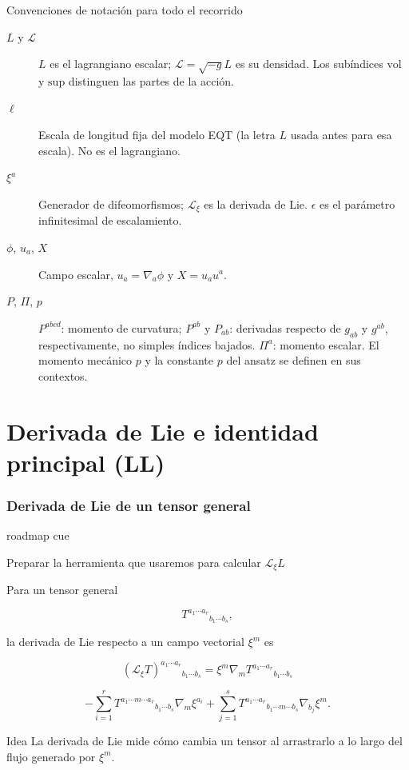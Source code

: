 \documentclass{beamer}
\newcommand{\Lie}{\mathcal{L}}
\newcommand{\RoadmapCue}[1]{%
    \begin{beamercolorbox}[
        wd=\textwidth,
        sep=.55ex,
        leftskip=.8ex,
        rounded=true
    ]{roadmap cue}

    \scriptsize
    \enspace #1

    \end{beamercolorbox}

    \vspace{.25em}
}
\begin{document}


\begin{frame}[label=nav-notation]{Convenciones de notación para todo el recorrido}
\small
\begin{description}
\item[$L$ y $\mathscr L$] $L$ es el lagrangiano escalar; $\mathscr L=\sqrt{-g}L$ es su densidad. Los subíndices $\mathrm{vol}$ y $\mathrm{sup}$ distinguen las partes de la acción.
\item[$\ell$] Escala de longitud fija del modelo EQT (la letra $L$ usada antes para esa escala). No es el lagrangiano.
\item[$\xi^a$] Generador de difeomorfismos; $\Lie_\xi$ es la derivada de Lie. $\epsilon$ es el parámetro infinitesimal de escalamiento.
\item[$\phi$, $u_a$, $X$] Campo escalar, $u_a=\nabla_a\phi$ y $X=u_au^a$.
\item[$P$, $\Pi$, $p$] $P^{abcd}$: momento de curvatura; $P^{ab}$ y $P_{ab}$: derivadas respecto de $g_{ab}$ y $g^{ab}$, respectivamente, no simples índices bajados. $\Pi^a$: momento escalar. El momento mecánico $p$ y la constante $p$ del ansatz se definen en sus contextos.
\end{description}
\end{frame}

\section{Derivada de Lie e identidad principal (LL)}

\begin{frame}[label=nav-frame-004]
\frametitle{Derivada de Lie de un tensor general}

\RoadmapCue{
Preparar la herramienta que usaremos para calcular
$\Lie_\xi L$
}
\small

Para un tensor general

\[
T^{a_1\cdots a_r}{}_{b_1\cdots b_s},
\]

la derivada de Lie respecto a un campo vectorial $\xi^m$ es

\[
(\Lie_\xi T)^{a_1\cdots a_r}{}_{b_1\cdots b_s}
=
\xi^m\nabla_mT^{a_1\cdots a_r}{}_{b_1\cdots b_s}
\]

\[
-\sum_{i=1}^{r}
T^{a_1\cdots m\cdots a_r}{}_{b_1\cdots b_s}
\nabla_m\xi^{a_i}
+
\sum_{j=1}^{s}
T^{a_1\cdots a_r}{}_{b_1\cdots m\cdots b_s}
\nabla_{b_j}\xi^m.
\]

\begin{block}{Idea}
La derivada de Lie mide cómo cambia un tensor al arrastrarlo a lo largo del flujo generado por $\xi^m$.
\end{block}

\end{frame}
\end{document}
